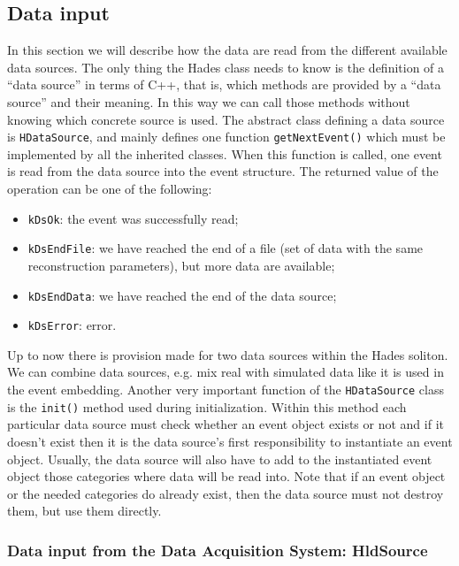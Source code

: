 \subsection{Data input}

In this section we will describe how the data are read from the different available 
data sources. The only thing the Hades class needs to know is the definition of a 
``data source'' in terms of C++, that is, which methods are provided by a ``data source'' 
and their meaning. In this way we can call those methods without knowing which concrete 
source is used.
The abstract class defining a data source is \verb+HDataSource+, and mainly defines one 
function \verb+getNextEvent()+ which must be implemented by all the inherited classes. 
When this function is called, one event is read from the data source into the event 
structure. The returned value of the operation can be one of the following:

\begin{itemize}
    \item \verb+kDsOk+: the event was successfully read; 
    \item \verb+kDsEndFile+: we have reached the end of a file (set of data with the same reconstruction parameters), but more data are available; 
    \item \verb+kDsEndData+: we have reached the end of the data source; 
    \item \verb+kDsError+: error. 
\end{itemize}

Up to now there is provision made for two data sources within the Hades soliton. 
We can combine data sources, e.g. mix real with simulated data like it is used in the 
event embedding.
Another very important function of the \verb+HDataSource+ class is the \verb+init()+ 
method used during initialization. Within this method each particular data source 
must check whether an event object exists or not and if it doesn't exist then it 
is the data source's first responsibility to instantiate an event object. Usually, 
the data source will also have to add to the instantiated event object those 
categories where data will be read into. Note that if an event object or the 
needed categories do already exist, then the data source must not destroy them, 
but use them directly. 

\subsubsection{Data input from the Data Acquisition System: HldSource}

